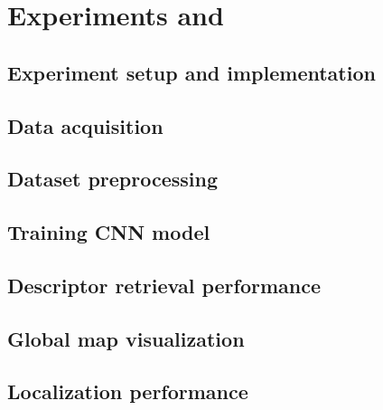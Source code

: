 \chapter{Experiments and }
\section{Experiment setup and implementation}
\section{Data acquisition}
\section{Dataset preprocessing}
\section{Training CNN model}
\section{Descriptor retrieval performance}
\section{Global map visualization}
\section{Localization performance}